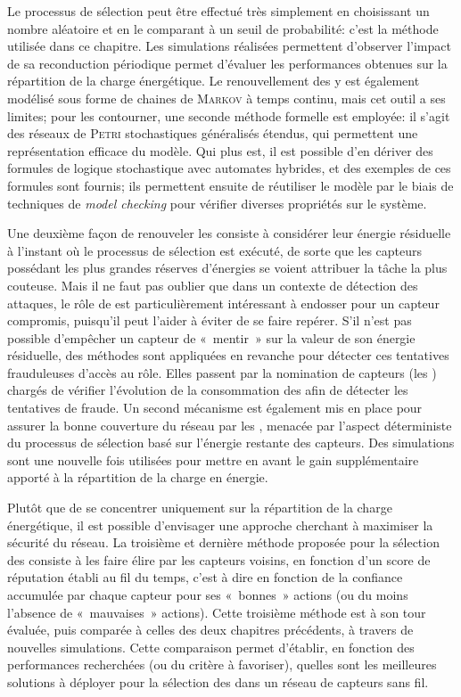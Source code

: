 Le processus de sélection peut être effectué très simplement en choisissant un nombre aléatoire et en le comparant à un seuil de probabilité: c'est la méthode utilisée dans ce chapitre.
Les simulations réalisées permettent d'observer l'impact de sa reconduction périodique permet d'évaluer les performances obtenues sur la répartition de la charge énergétique.
Le renouvellement des \cnst y est également modélisé sous forme de chaines de \textsc{Markov} à temps continu, mais cet outil a ses limites; pour les contourner, une seconde méthode formelle est employée: il s'agit des réseaux de \textsc{Petri} stochastiques généralisés étendus, qui permettent une représentation efficace du modèle.
Qui plus est, il est possible d'en dériver des formules de logique stochastique avec automates hybrides, et des exemples de ces formules sont fournis; ils permettent ensuite de réutiliser le modèle par le biais de techniques de \textit{model checking} pour vérifier diverses propriétés sur le système.

Une deuxième façon de renouveler les \cnst consiste à considérer leur énergie résiduelle à l'instant où le processus de sélection est exécuté, de sorte que les capteurs possédant les plus grandes réserves d'énergies se voient attribuer la tâche la plus couteuse.
Mais il ne faut pas oublier que dans un contexte de détection des attaques, le rôle de \cnt est particulièrement intéressant à endosser pour un capteur compromis, puisqu'il peut l'aider à éviter de se faire repérer.
S'il n'est pas possible d'empêcher un capteur de « mentir » sur la valeur de son énergie résiduelle, des méthodes sont appliquées en revanche pour détecter ces tentatives frauduleuses d'accès au rôle.
Elles passent par la nomination de capteurs (les \vnst) chargés de vérifier l'évolution de la consommation des \cnst afin de détecter les tentatives de fraude.
Un second mécanisme est également mis en place pour assurer la bonne couverture du réseau par les \cnst, menacée par l'aspect déterministe du processus de sélection basé sur l'énergie restante des capteurs.
Des simulations sont une nouvelle fois utilisées pour mettre en avant le gain supplémentaire apporté à la répartition de la charge en énergie.

Plutôt que de se concentrer uniquement sur la répartition de la charge énergétique, il est possible d'envisager une approche cherchant à maximiser la sécurité du réseau.
La troisième et dernière méthode proposée pour la sélection des \cnst consiste à les faire élire par les capteurs voisins, en fonction d'un score de réputation établi au fil du temps, c'est à dire en fonction de la confiance accumulée par chaque capteur pour ses « bonnes » actions (ou du moins l'absence de « mauvaises » actions).
Cette troisième méthode est à son tour évaluée, puis comparée à celles des deux chapitres précédents, à travers de nouvelles simulations.
Cette comparaison permet d'établir, en fonction des performances recherchées (ou du critère à favoriser), quelles sont les meilleures solutions à déployer pour la sélection des \cnst dans un réseau de capteurs sans fil.

